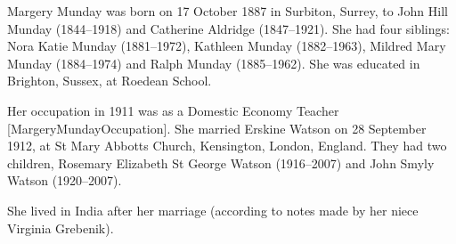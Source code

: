 
Margery Munday was born on 17 October 1887 in	Surbiton, Surrey, to John Hill Munday (1844--1918) and Catherine Aldridge (1847--1921). She had four siblings: Nora Katie Munday (1881--1972), Kathleen Munday (1882--1963), Mildred Mary Munday (1884--1974) and Ralph Munday (1885--1962).
She was educated in Brighton, Sussex, at Roedean School.

Her occupation in 1911 was as a Domestic Economy Teacher [MargeryMundayOccupation].
She married Erskine Watson on 28 September 1912, at St Mary Abbotts Church, Kensington, London, England.  They had two children, Rosemary Elizabeth St George Watson (1916--2007) and John Smyly Watson (1920--2007).

She lived in India after her marriage (according to notes made by her niece Virginia Grebenik).
